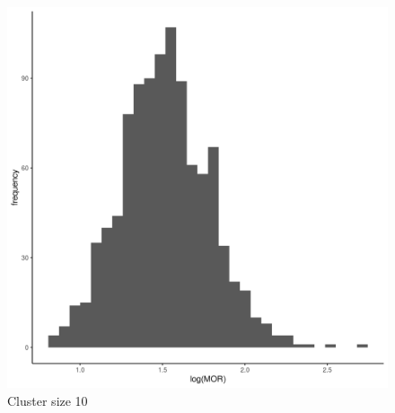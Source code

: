 \documentclass[
  letterpaper,
  DIV=11,
  numbers=noendperiod,
  titlepage]{scrartcl}
\begin{document}
\begin{figure}
\begin{minipage}[t]{0.24\linewidth}
{{\includegraphics{../../plots/two-lvl-ran-int/high-prev/hist_50_10_two_lvl_high_prev.png}

}

\caption{Cluster size 10}

}

\end{minipage}%
%
\begin{minipage}[t]{0.24\linewidth}

{\centering 

}
\end{minipage}
\end{figure}
\end{document}
